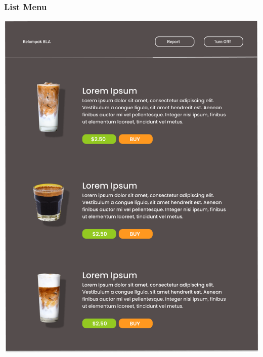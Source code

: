 \documentclass[12pt]{article}
\begin{document}
\subsubsection{List Menu}
\includegraphics[width=1\linewidth]{./img/listMenu.png}
\end{document}
